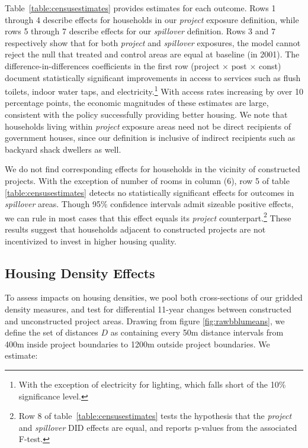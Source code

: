 \documentclass[12pt]{article}
\begin{document}
Table~\ref{table:censusestimates} provides estimates for each outcome. Rows 1 through 4 describe effects for households in our {\it project} exposure definition, while rows 5 through 7 describe effects for our {\it spillover} definition. Rows 3 and 7 respectively show that for both {\it project} and {\it spillover} exposures, the model cannot reject the null that treated and control areas are equal at baseline (in 2001). The difference-in-differences coefficients in the first row (project$\,\times\,$post$\,\times\,$const) document statistically significant improvements in access to services such as flush toilets, indoor water taps, and electricity.\footnote{With the exception of electricity for lighting, which falls short of the 10\% significance level. } With access rates increasing by over 10 percentage points, the economic magnitudes of these estimates are large, consistent with the policy successfully providing better housing. We note that households living within {\it project} exposure areas need not be direct recipients of government houses, since our definition is inclusive of indirect recipients such as backyard shack dwellers as well. 

We do not find corresponding effects for households in the vicinity of constructed projects. With the exception of number of rooms in column (6), row 5 of table \ref{table:censusestimates} detects no statistically significant effects for outcomes in {\it spillover} areas. Though 95\% confidence intervals admit sizeable positive effects, we can rule in most cases that this effect equals its {\it project} counterpart.\footnote{Row 8 of table~\ref{table:censusestimates} tests the hypothesis that the {\it project} and {\it spillover} DID effects are equal, and reports p-values from the associated F-test.} These results suggest that households adjacent to constructed projects are not incentivized to invest in higher housing quality. 


\subsection{Housing Density Effects}\label{section:bbluestimates}

To assess impacts on housing densities, we pool both cross-sections of our gridded density measures, and test for differential 11-year changes between constructed and unconstructed project areas. Drawing from figure \ref{fig:rawbblumeans}, we define the set of distances $D$ as containing every 50m distance intervals from 400m inside project boundaries to 1200m outside project boundaries. We estimate: 
\end{document}
